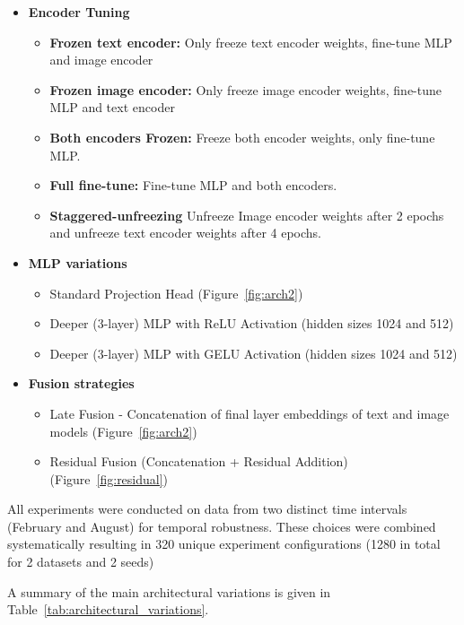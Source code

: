 \begin{itemize}
\item  \textbf{Encoder Tuning}
\begin{itemize}
    \item \textbf{Frozen text encoder:} Only freeze text encoder weights, fine-tune MLP and image encoder
    \item \textbf{Frozen image encoder:} Only freeze image encoder weights, fine-tune MLP and text encoder
    \item \textbf{Both encoders Frozen:} Freeze both encoder weights, only fine-tune MLP.
    \item \textbf{Full fine-tune:} Fine-tune MLP and both encoders.
    \item \textbf{Staggered-unfreezing} Unfreeze Image encoder weights after 2 epochs and unfreeze text encoder weights after 4 epochs.
\end{itemize}

\item \textbf{MLP variations}
\begin{itemize}
    \item Standard Projection Head (Figure~\ref{fig:arch2})
    \item Deeper (3-layer) MLP with ReLU Activation (hidden sizes 1024 and 512)
    \item Deeper (3-layer) MLP with GELU Activation (hidden sizes 1024 and 512)
\end{itemize}



\item \textbf{Fusion strategies}
\begin{itemize}
    \item Late Fusion - Concatenation of final layer embeddings of text and image models (Figure~\ref{fig:arch2})
    \item Residual Fusion (Concatenation + Residual Addition) (Figure~\ref{fig:residual})
\end{itemize}
\end{itemize}


All experiments were conducted on data from two distinct time intervals (February and August) for temporal robustness. These choices were combined systematically resulting in 320 unique experiment configurations (1280 in total for 2 datasets and 2 seeds)
\newline


A summary of the main architectural variations is given in Table~\ref{tab:architectural_variations}.

